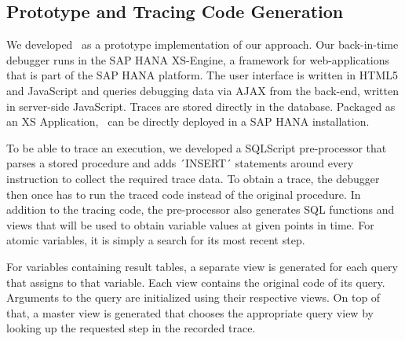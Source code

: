 

\subsection{Prototype and Tracing Code Generation}

We developed \tool\ as a prototype implementation of our approach.
Our back-in-time debugger runs in the SAP HANA XS-Engine, a framework for web-applications that is part of the SAP HANA platform.
The user interface is written in HTML5 and JavaScript and queries debugging data via AJAX from the back-end, written in server-side JavaScript.
Traces are stored directly in the database.
Packaged as an XS Application, \tool\ can be directly deployed in a SAP HANA installation.


To be able to trace an execution, we developed a SQLScript pre-processor that parses a stored procedure and adds ´INSERT´ statements around every instruction to collect the required trace data.
To obtain a trace, the debugger then once has to run the traced code instead of the original procedure.
In addition to the tracing code, the pre-processor also generates SQL functions and views that will be used to obtain variable values at given points in time.
For atomic variables, it is simply a search for its most recent step.

For variables containing result tables, a separate view is generated for each query that assigns to that variable.
Each view contains the original code of its query.
Arguments to the query are initialized using their respective views.
On top of that, a master view is generated that chooses the appropriate query view by looking up the requested step in the recorded trace.

